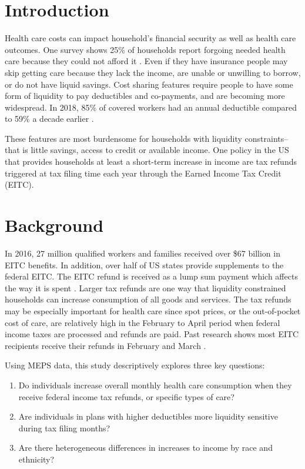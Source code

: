 \documentclass[smallcondensed,referee]{svjour3}
\begin{document}
\section{Introduction}
Health care costs can impact household's financial security as well as health care outcomes. One survey shows 25\% of households report forgoing needed health care because they could not afford it \citep{jones_gallup_2019}. Even if they have insurance people may skip getting care because they lack the income, are unable or unwilling to borrow, or do not have liquid savings. Cost sharing features require people to have some form of liquidity to pay deductibles and co-payments, and are becoming more widespread.
In 2018, 85\% of covered workers had an annual deductible compared to 59\% a decade earlier \citep{claxton_employer_2018}.


These features are most burdensome for households with liquidity constraints--that is little savings, access to credit or available income. One policy in the US that provides households at least a short-term increase in income are tax refunds triggered at tax filing time each year through the Earned Income Tax Credit (EITC). 



\section{Background}

 In 2016, 27 million qualified workers and families received over \$67 billion in EITC benefits. In addition, over half of US states provide supplements to the federal EITC. The EITC refund is received as a lump sum payment which affects the way it is spent \citep{goodman-bacon_how_2008}. Larger tax refunds are one way that liquidity constrained households can increase consumption of all goods and services. The tax refunds may be especially important for health care since spot prices, or the out-of-pocket cost of care, are relatively high in the February to April period when federal income taxes are processed and refunds are paid. Past research shows most  EITC recipients receive their refunds in February and March \citep{barrow_effects_2000}. 



Using MEPS data, this study descriptively explores three key questions: 
\begin{enumerate}
\item Do individuals increase overall monthly health care consumption when they receive federal income tax refunds, or specific types of care? 
\item Are  individuals in plans with higher deductibles more liquidity sensitive during tax filing months?
\item Are there heterogeneous differences in increases to income by race and ethnicity?
\end{enumerate}
\end{document}
